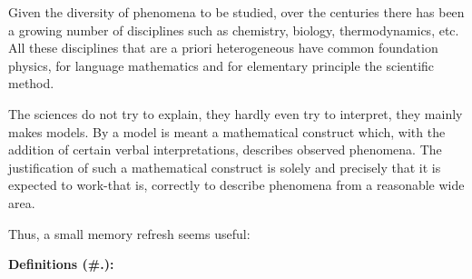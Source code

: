 	Given the diversity of phenomena to be studied, over the centuries there has been a growing number of disciplines such as chemistry, biology, thermodynamics, etc. All these disciplines that are a priori heterogeneous have common foundation physics, for language mathematics and for elementary principle the scientific method.
	
	\begin{fquote}The sciences do not try to explain, they hardly even try to interpret, they mainly makes models. By a model is meant a mathematical construct which, with the addition of certain verbal interpretations, describes observed phenomena. The justification of such a mathematical construct is solely and precisely that it is expected to work-that is, correctly to describe phenomena from a reasonable wide area.
 	\end{fquote}

	Thus, a small memory refresh seems useful:

\textbf{Definitions (\#\thesection.\mydef):}

